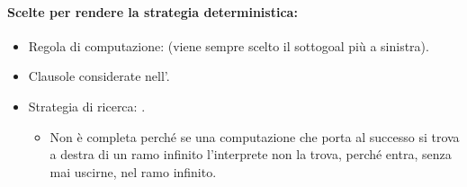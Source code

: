 \paragraph{Scelte per rendere la strategia deterministica:}

\begin{itemize}
  \item Regola di computazione:  (viene sempre scelto il sottogoal più a sinistra). 
  \item Clausole considerate nell’. 
  \item Strategia di ricerca: . 
    \begin{itemize}
      \item Non è completa perché se una computazione che porta al successo si trova a destra di un ramo infinito l'interprete non la trova, perché entra, senza mai uscirne, nel ramo infinito.
    \end{itemize}
\end{itemize}





